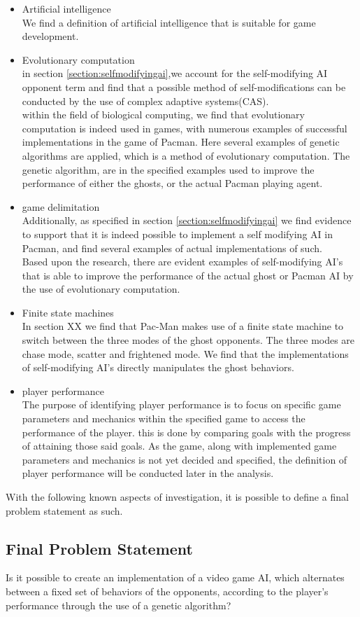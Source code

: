 \begin{itemize}
\item Artificial intelligence\\
We find a definition of artificial intelligence that is suitable for game development. 

\item Evolutionary computation\\
in section \ref{section:selfmodifyingai},we account for the self-modifying AI opponent term and find that a possible method of self-modifications can be conducted by the use of complex adaptive systems(CAS).\\

within the field of biological computing, we find that evolutionary computation is indeed used in games, with numerous examples of successful implementations in the game of Pacman. Here several examples of genetic algorithms are applied, which is a method of evolutionary computation. The genetic algorithm, are in the specified examples used to improve the performance of either the ghosts, or the actual Pacman playing agent.
\item game delimitation\\
Additionally, as specified in section \ref{section:selfmodifyingai} we find evidence to support that it is indeed possible to implement a self modifying AI in Pacman, and find several examples of actual implementations of such.\\

Based upon the research, there are evident examples of self-modifying AI's that is able to improve the performance of the actual ghost or Pacman AI by the use of evolutionary computation. 
\item Finite state machines\\
In section XX we find that Pac-Man makes use of a finite state machine to switch between the three modes of the ghost opponents. The three modes are chase mode, scatter and frightened mode. We find that the implementations of self-modifying AI's directly manipulates the ghost behaviors. 

\item player performance\\
The purpose of identifying player performance is to focus on specific game parameters and mechanics within the specified game to access the performance of the player. this is done by comparing goals with the progress of attaining those said goals. As the game, along with implemented game parameters and mechanics is not yet decided and specified, the definition of player performance will be conducted later in the analysis.
\end{itemize}

With the following known aspects of investigation, it is possible to define a final problem statement as such.


\subsection{Final Problem Statement} \label{sec:finalproblemstatement}
Is it possible to create an implementation of a video game AI, which alternates between a fixed set of behaviors of the opponents, according to the player's performance through the use of a genetic algorithm?
